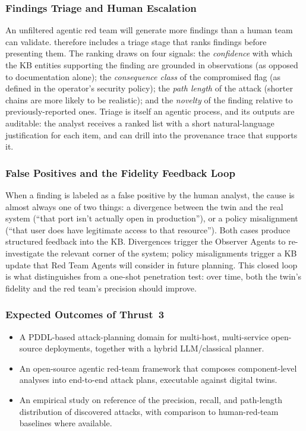 \subsubsection{Findings Triage and Human Escalation}

An unfiltered agentic red team will generate more findings than a
human team can validate. \sysname therefore includes a triage stage
that ranks findings before presenting them. The ranking draws on four
signals: the \emph{confidence} with which the KB entities supporting
the finding are grounded in observations (as opposed to documentation
alone); the \emph{consequence class} of the compromised flag (as
defined in the operator's security policy); the \emph{path length} of
the attack (shorter chains are more likely to be realistic); and the
\emph{novelty} of the finding relative to previously-reported ones.
Triage is itself an agentic process, and its outputs are auditable:
the analyst receives a ranked list with a short natural-language
justification for each item, and can drill into the provenance trace
that supports it.

\subsubsection{False Positives and the Fidelity Feedback Loop}

When a finding is labeled as a false positive by the human analyst,
the cause is almost always one of two things: a divergence between
the twin and the real system (``that port isn't actually open in
production''), or a policy misalignment (``that user does have
legitimate access to that resource''). Both cases produce structured
feedback into the KB. Divergences trigger the Observer Agents to
re-investigate the relevant corner of the system; policy
misalignments trigger a KB update that Red Team Agents will consider
in future planning. This closed loop is what distinguishes \sysname
from a one-shot penetration test: over time, both the twin's fidelity
and the red team's precision should improve.

\subsubsection{Expected Outcomes of Thrust~3}
\begin{itemize}[leftmargin=1.3em,itemsep=0.1em,topsep=0.2em]
  \item A PDDL-based attack-planning domain for multi-host, multi-service
  open-source deployments, together with a hybrid LLM/classical planner.
  \item An open-source agentic red-team framework that composes
  component-level analyses into end-to-end attack plans, executable
  against \sysname digital twins.
  \item An empirical study on reference \CPSs of the precision, recall,
  and path-length distribution of discovered attacks, with comparison
  to human-red-team baselines where available.
\end{itemize}
